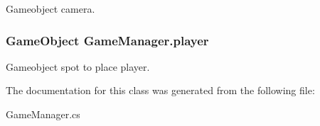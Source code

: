Gameobject camera. 

\hypertarget{classGameManager_abe8e79771775bc67c63c4ac43349dc8a}{
\subsubsection[{player}]{\setlength{\rightskip}{0pt plus 5cm}Game\-Object Game\-Manager.\-player}}\label{classGameManager_abe8e79771775bc67c63c4ac43349dc8a}


Gameobject spot to place player. 



The documentation for this class was generated from the following file\-:\begin{DoxyCompactItemize}
\item 
Game\-Manager.\-cs\end{DoxyCompactItemize}
